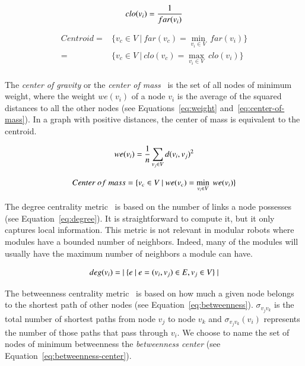 \begin{equation}
\normalsize
\label{eq:closeness}
clo(v_i) = \frac{1}{far(v_i)}
\end{equation}

{
\equationTextSize
\begin{align}
\label{eq:centroid-sum}
Centroid = & \{v_c \in V\ |\ far(v_c) = \min\limits_{v_i \in V}\ far(v_i)\}\\
\label{eq:centroid-closeness}
= &\{v_c \in V\ |\ clo(v_c) = \max\limits_{v_i \in V}\ clo(v_i)\}\\
\end{align}
}

The {\em center of gravity} or the {\em center of mass}~\cite{dutot:hal-00742845} is the set of all nodes of minimum weight, where the weight $we(v_i)$ of a node $v_i$ is the average of the squared distances to all the other nodes (see Equations~\eqref{eq:weight} and~\eqref{eq:center-of-mass}). In a graph with positive distances, the center of mass is equivalent to the centroid.

\begin{equation}
\normalsize
\label{eq:weight}
we(v_i) = \frac{1}{n} \sum_{v_j \in V} d(v_i,v_j)^2
\end{equation}

\begin{equation}
\equationTextSize
\label{eq:center-of-mass}
Center\ of\ mass = \{v_c \in V\ |\ we(v_c) = \min\limits_{v_i \in V}\ we(v_i)\}
\end{equation}

The degree centrality metric~\cite{freeman1979centrality} is based on the number of links a node possesses (see Equation~\eqref{eq:degree}). It is straightforward to compute it, but it only captures local information. This metric is not relevant in modular robots where modules have a bounded number of neighbors. Indeed, many of the modules will usually have the maximum number of neighbors a module can have. 

\begin{equation}
\normalsize
\label{eq:degree}
deg(v_i) = |\ \{ e\ |\ e = (v_i,v_j) \in E, v_j \in V \}\ |
\end{equation}

The betweenness centrality metric~\cite{freeman1979centrality} is based on how much a given node belongs to the shortest path of other nodes (see Equation~\eqref{eq:betweenness}). $\sigma_{v_jv_k}$ is the total number of shortest paths from node $v_j$ to node $v_k$ and $\sigma_{v_jv_k}(v_i)$ represents the number of those paths that pass through $v_i$. We choose to name the set of nodes of minimum betweenness the {\em betweenness center} (see Equation~\eqref{eq:betweenness-center}).


